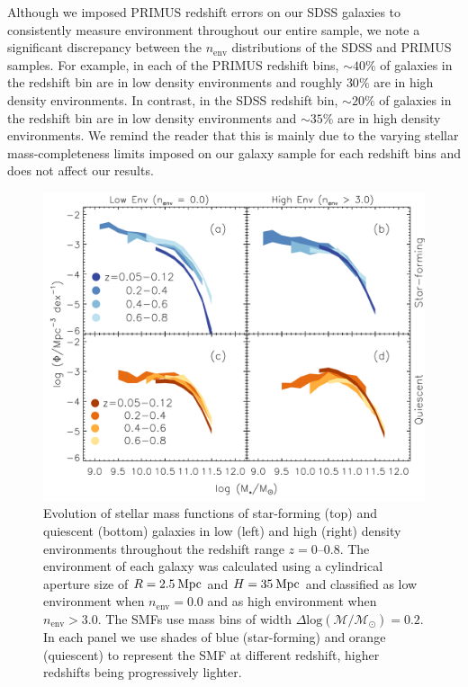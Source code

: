 Although we imposed PRIMUS redshift errors on our SDSS galaxies to consistently measure environment throughout our entire sample, we note a significant discrepancy between the $n_{\mathrm{env}}$ distributions of the SDSS and PRIMUS samples. For example, in each of the PRIMUS redshift bins, $\sim 40 \%$ of galaxies in the redshift bin are in low density environments and roughly $30 \%$ are in high density environments. In contrast, in the SDSS redshift bin, $\sim 20 \%$ of galaxies in the redshift bin are in low density environments and $\sim 35 \%$ are in high density environments. We remind the reader that this is mainly due to the varying stellar mass-completeness limits imposed on our galaxy sample for each redshift bins and does not affect our results. 
\begin{figure}
\begin{center}
\includegraphics[width=\textwidth]{figs/qfenv/fig3.pdf}
     \caption{Evolution of stellar mass functions of star-forming (top) and quiescent (bottom) galaxies in 
low (left) and high (right) density environments throughout the redshift range
$z=0$--$0.8$. The environment of each galaxy  
was calculated using a cylindrical aperture size of $R=2.5 \: \mathrm{Mpc}$ and $H=35 \: \mathrm{Mpc}$ and classified as low environment when $n_{\mathrm{env}} = 0.0$ and as high environment when $n_{\mathrm{env}} > 3.0$. The SMFs use mass bins of 
width $\Delta \mathrm{log}(\mathcal{M}/\mathcal{M}_{\odot})=0.2$. In each panel we use shades of blue 
(star-forming) and orange (quiescent) to represent the SMF at different redshift, higher redshifts being
progressively lighter.}      \label{fig:smf}
\end{center}
\end{figure}
